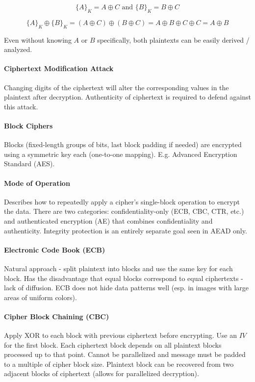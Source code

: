$$
\{A\}_K = A \oplus C \text{ and } \{B\}_K = B \oplus C
$$

$$
\{A\}_K \oplus \{B\}_K = (A \oplus C) \oplus (B \oplus C) = A \oplus B \oplus C \oplus C = A \oplus B
$$

Even without knowing $A$ or $B$ specifically, both plaintexts can be easily derived / analyzed.

\paragraph{Ciphertext Modification Attack}
Changing digits of the ciphertext will alter the corresponding values in the plaintext after decryption. Authenticity of ciphertext is required to defend against this attack.

\paragraph{Block Ciphers}
Blocks (fixed-length groups of bits, last block padding if needed) are encrypted using a symmetric key each (one-to-one mapping).
E.g. Advanced Encryption Standard (AES).

\paragraph{Mode of Operation}
Describes how to repeatedly apply a cipher's single-block operation to encrypt the data. There are two categories: confidentiality-only (ECB, CBC, CTR, etc.) and authenticated encryption (AE) that combines confidentiality and authenticity. Integrity protection is an entirely separate goal seen in AEAD only.

\paragraph{Electronic Code Book (ECB)} 
Natural approach - split plaintext into blocks and use the same key for each block. Has the disadvantage that equal blocks correspond to equal ciphertexts - lack of diffusion. ECB does not hide data patterns well (esp. in images with large areas of uniform colors).

\paragraph{Cipher Block Chaining (CBC)}
Apply XOR to each block with previous ciphertext before encrypting. Use an $IV$ for the first block. Each ciphertext block depends on all plaintext blocks processed up to that point. Cannot be parallelized and message must be padded to a multiple of cipher block size. Plaintext block can be recovered from two adjacent blocks of ciphertext (allows for parallelized decryption).

